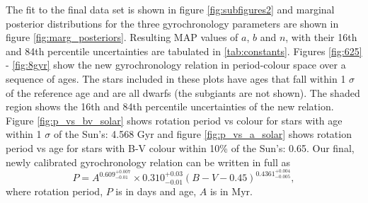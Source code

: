 \documentclass[10pt,preprint]{aastex}
\newcommand{\gyroa}{0.310}
\newcommand{\aerrp}{0.03}
\newcommand{\aerrm}{0.01}
\newcommand{\gyron}{0.609}
\newcommand{\nerrp}{0.007}
\newcommand{\nerrm}{0.01}
\newcommand{\gyrob}{0.4361}
\newcommand{\berrp}{0.004}
\newcommand{\berrm}{0.005}
\begin{document}
The fit to the final data set is shown in figure \ref{fig:subfigures2} and marginal posterior distributions for the three gyrochronology parameters are shown in figure \ref{fig:marg_posteriors}.
Resulting MAP values of $a$, $b$ and $n$, with their 16th and 84th percentile uncertainties are tabulated in \ref{tab:constants}.
Figures \ref{fig:625} - \ref{fig:8gyr} show the new gyrochronology relation in period-colour space over a sequence of ages.
The stars included in these plots have ages that fall within 1 $\sigma$ of the reference age and are all dwarfs (the subgiants are not shown).
The shaded region shows the 16th and 84th percentile uncertainties of the new relation.
Figure \ref{fig:p_vs_bv_solar} shows rotation period vs colour for stars with age within 1 $\sigma$ of the Sun's: 4.568 Gyr and figure \ref{fig:p_vs_a_solar} shows rotation period vs age for stars with B-V colour within 10\% of the Sun's: 0.65.
Our final, newly calibrated gyrochronology relation can be written in full as
\begin{equation}
	P = A^{\gyron^{+\nerrp}_{-\nerrm}} \times \gyroa^{+\aerrp}_{-\aerrm}(B-V-0.45)^{\gyrob^{+\berrp}_{-\berrm}},
\label{eq:Barnes2007_2}
\end{equation}
where rotation period, $P$ is in days and age, $A$ is in Myr.
\end{document}

